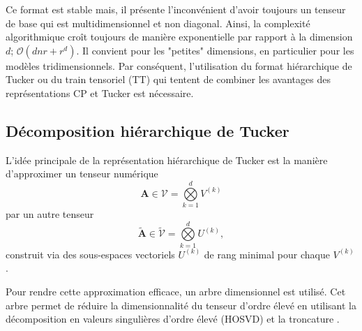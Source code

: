\documentclass[11pt,a4paper,oneside]{book}
\def\op{\mathcal O}
\def\gktensor{\overset{d}{\underset{k=1}{\bigotimes}}}
\newcommand{\mbf}[1]{\mathbf{#1}}
\begin{document}
Ce format est stable mais, il présente l'inconvénient d'avoir toujours un tenseur de base qui est multidimensionnel et non diagonal. Ainsi, la complexité algorithmique croît toujours de manière exponentielle par rapport à la dimension $ d $; $\op(dnr+r^{d})$\cite[p.2296]{oseledets2011tensor}.
Il convient pour les "petites" dimensions, en particulier pour les modèles tridimensionnels. Par conséquent, l'utilisation du format hiérarchique de Tucker ou du train tensoriel (TT) qui tentent de combiner les avantages des représentations CP et Tucker est nécessaire. 


%


\subsection{Décomposition hiérarchique de Tucker}
\label{subsec:tens_Ht-TT}
L'idée principale de la représentation hiérarchique de Tucker est la manière d'approximer un tenseur numérique
$$\mbf{A}\in \mathcal{V}=\gktensor V^{(k)}$$
par un autre tenseur
\begin{equation}
\tilde{\mathbf{A}} \in \tilde{\mathcal{V}}=\gktensor U^{(k)},
\end{equation}
construit via des sous-espaces vectoriels $U^{(k)}$ de rang minimal pour chaque $V^{(k)}$.

 Pour rendre cette approximation efficace, un arbre dimensionnel est utilisé. Cet arbre permet de réduire la dimensionnalité du tenseur d'ordre élevé en utilisant la décomposition en valeurs singulières d'ordre élevé (HOSVD) et la troncature \cite[p.140]{Nyenyezi2018}.
 
\end{document}
